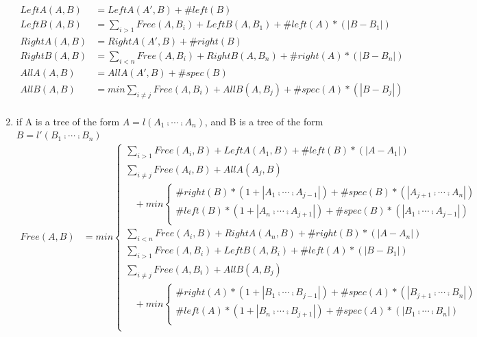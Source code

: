 \begin{theorem}
\begin{enumerate}
\begin{align*}
LeftA(A, B) &= LeftA(A', B) + \#left(B)\\
LeftB(A, B) &= \sum_{i>1}Free(A, B_i) + LeftB(A, B_1) + \#left(A)* (\left\vert B - B_1 \right\vert)\\
RightA(A, B) &= RightA(A', B) + \#right(B)\\
RightB(A, B) &= \sum_{i<n}Free(A, B_i) + RightB(A, B_n) + \#right(A) * (\left\vert B - B_n \right\vert)\\
AllA(A, B) &= AllA(A', B) + \#spec(B)\\
AllB(A, B) &= min \sum_{i \neq j}Free(A, B_i) + AllB(A, B_j) + \#spec(A) * (\left\vert B - B_j \right\vert)\\	
\end{align*}
\item if A is a tree of the form $A = l(A_1 \comp \cdots \comp A_n)$, and B is a tree of the form $B = l'(B_1 \comp \cdots \comp B_n)$
\begin{align*}
Free(A, B) &= min \begin{cases}
			\sum_{i>1}Free(A_i, B) + LeftA(A_1, B) + \#left(B)*(\left\vert A - A_1 \right\vert) \\
			\sum_{i \neq j}Free(A_i, B) + AllA(A_j, B) \\
			\ \ \ \ + min\begin{cases}
			\#right(B) * (1 + \left\vert A_1 \comp \cdots \comp A_{j-1} \right\vert) + \#spec(B) * (\left\vert A_{j+1} \comp \cdots \comp A_n \right\vert) \\
			\#left(B) * (1 + \left\vert A_n \comp \cdots \comp A_{j+1} \right\vert) + \#spec(B) * (\left\vert A_1 \comp \cdots \comp A_{j-1} \right\vert) \\
			\end{cases}\\
			\sum_{i<n}Free(A_i, B) + RightA(A_n, B) + \#right(B)*(\left\vert A - A_n \right\vert) \\
			\sum_{i>1}Free(A, B_i) + LeftB(A, B_i) + \#left(A)*(\left\vert B - B_1 \right\vert) \\
			\sum_{i \neq j}Free(A, B_i) + AllB(A, B_j) \\
			\ \ \ \ + min\begin{cases}
			\#right(A) * (1 + \left\vert B_1 \comp \cdots \comp B_{j-1} \right\vert) + \#spec(A) * (\left\vert B_{j+1} \comp \cdots \comp B_n \right\vert)\\
			\#left(A) * (1 + \left\vert B_n \comp \cdots \comp B_{j+1} \right\vert) + \#spec(A) * (\left\vert B_1 \comp \cdots \comp B_n \right\vert) \\
			\end{cases}\\

\end{cases}
\end{align*}
\end{enumerate}
\end{theorem}
